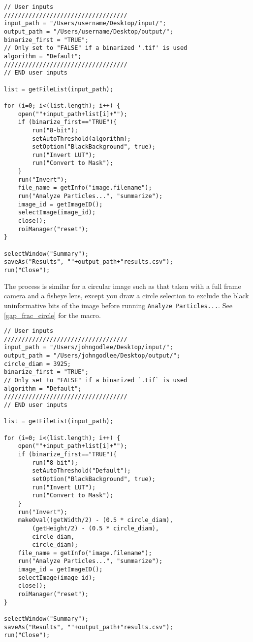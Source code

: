 \documentclass{article}
\newcommand\menu[1]{\texttt{\color{blue}#1}}
\newcommand\file[1]{\texttt{\underline{#1}}}
\begin{document}
\begin{minipage}{\linewidth}
\begin{lstlisting}[label=gap_frac_image, caption=ImageJ macro to calculate the gap fraction of a full image. The macro can also be found in \file{gap\_frac\_image.ijm}.]
// User inputs
///////////////////////////////////
input_path = "/Users/username/Desktop/input/";
output_path = "/Users/username/Desktop/output/";
binarize_first = "TRUE";
// Only set to "FALSE" if a binarized '.tif' is used
algorithm = "Default";
///////////////////////////////////
// END user inputs

list = getFileList(input_path);

for (i=0; i<(list.length); i++) {
	open(""+input_path+list[i]+"");
	if (binarize_first=="TRUE"){
		run("8-bit");
		setAutoThreshold(algorithm);
		setOption("BlackBackground", true);
		run("Invert LUT");
		run("Convert to Mask");
	}
	run("Invert");
	file_name = getInfo("image.filename");
	run("Analyze Particles...", "summarize");
	image_id = getImageID();
	selectImage(image_id);
	close();
	roiManager("reset");
}

selectWindow("Summary"); 
saveAs("Results", ""+output_path+"results.csv"); 
run("Close");
\end{lstlisting}
\end{minipage}

The process is similar for a circular image such as that taken with a full frame camera and a fisheye lens, except you draw a circle selection to exclude the black uninformative bits of the image before running \menu{Analyze Particles...}. See \autoref{gap_frac_circle} for the macro. 

\begin{minipage}{\linewidth}
\begin{lstlisting}[label=gap_frac_circle, caption=ImageJ macro to calculate the gap fraction of a circular selection of an image. The macro can also be found in \file{gap\_frac\_circle.ijm}.]
// User inputs
///////////////////////////////////
input_path = "/Users/johngodlee/Desktop/input/";
output_path = "/Users/johngodlee/Desktop/output/";
circle_diam = 3925;
binarize_first = "TRUE";
// Only set to "FALSE" if a binarized `.tif` is used
algorithm = "Default";
///////////////////////////////////
// END user inputs

list = getFileList(input_path);

for (i=0; i<(list.length); i++) {
	open(""+input_path+list[i]+"");
	if (binarize_first=="TRUE"){
		run("8-bit");
		setAutoThreshold("Default");
		setOption("BlackBackground", true);
		run("Invert LUT");
		run("Convert to Mask");
	}
	run("Invert");
	makeOval((getWidth/2) - (0.5 * circle_diam),
		(getHeight/2) - (0.5 * circle_diam),
		circle_diam,
		circle_diam);
	file_name = getInfo("image.filename");
	run("Analyze Particles...", "summarize");
	image_id = getImageID();
	selectImage(image_id);
	close();
	roiManager("reset");
}

selectWindow("Summary"); 
saveAs("Results", ""+output_path+"results.csv"); 
run("Close");
\end{lstlisting}
\end{minipage}
\end{document}
